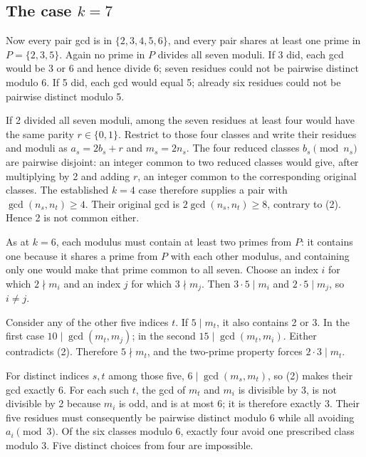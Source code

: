 \documentclass[11pt,a4paper]{article}
\begin{document}
\subsection{\texorpdfstring{The case \(k=7\)}{The case k=7}}\label{the-case-k7}

Now every pair gcd is in \(\{2,3,4,5,6\}\), and every pair shares at least one prime in \(P=\{2,3,5\}\). Again no prime in \(P\) divides all seven moduli. If 3 did, each gcd would be 3 or 6 and hence divide 6; seven residues could not be pairwise distinct modulo 6. If 5 did, each gcd would equal 5; already six residues could not be pairwise distinct modulo 5.

If 2 divided all seven moduli, among the seven residues at least four would have the same parity \(r\in\{0,1\}\). Restrict to those four classes and write their residues and moduli as \(a_s=2b_s+r\) and \(m_s=2n_s\). The four reduced classes \(b_s\pmod{n_s}\) are pairwise disjoint: an integer common to two reduced classes would give, after multiplying by 2 and adding \(r\), an integer common to the corresponding original classes. The established \(k=4\) case therefore supplies a pair with \(\gcd(n_s,n_t)\ge4\). Their original gcd is \(2\gcd(n_s,n_t)\ge8\), contrary to (2). Hence 2 is not common either.

As at \(k=6\), each modulus must contain at least two primes from \(P\): it contains one because it shares a prime from \(P\) with each other modulus, and containing only one would make that prime common to all seven. Choose an index \(i\) for which \(2\nmid m_i\) and an index \(j\) for which \(3\nmid m_j\). Then \(3\cdot5\mid m_i\) and \(2\cdot5\mid m_j\), so \(i\ne j\).

Consider any of the other five indices \(t\). If \(5\mid m_t\), it also contains 2 or 3. In the first case \(10\mid\gcd(m_t,m_j)\); in the second \(15\mid\gcd(m_t,m_i)\). Either contradicts (2). Therefore \(5\nmid m_t\), and the two-prime property forces \(2\cdot3\mid m_t\).

For distinct indices \(s,t\) among those five, \(6\mid\gcd(m_s,m_t)\), so (2) makes their gcd exactly 6. For each such \(t\), the gcd of \(m_t\) and \(m_i\) is divisible by 3, is not divisible by 2 because \(m_i\) is odd, and is at most 6; it is therefore exactly 3. Their five residues must consequently be pairwise distinct modulo 6 while all avoiding \(a_i\pmod3\). Of the six classes modulo 6, exactly four avoid one prescribed class modulo 3. Five distinct choices from four are impossible.
\end{document}
